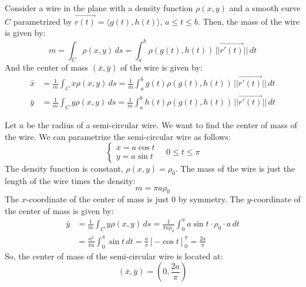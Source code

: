 \documentclass[11pt]{report}
\begin{document}
\begin{definition}
    Consider a wire in the plane with a density function $\rho(x,y)$ and a smooth curve $C$ parametrized by $\vec{r(t)} = \langle g(t), h(t) \rangle$, $a \leq t \leq b$. Then, the mass of the wire is given by:
    \begin{equation}
        m = \int_C \rho(x,y) \, ds = \int_a^b \rho(g(t), h(t)) \, ||\vec{r'(t)}|| \, dt
    \end{equation}
    And the center of mass $(\bar{x}, \bar{y})$ of the wire is given by:
    \begin{align}
        \bar{x} &= \frac{1}{m} \int_C x \rho(x,y) \, ds = \frac{1}{m} \int_a^b g(t) \rho(g(t), h(t)) \, ||\vec{r'(t)}|| \, dt \\
        \bar{y} &= \frac{1}{m} \int_C y \rho(x,y) \, ds = \frac{1}{m} \int_a^b h(t) \rho(g(t), h(t)) \, ||\vec{r'(t)}|| \, dt
    \end{align}
\end{definition}

\begin{example}
    Let $a$ be the radius of a semi-circular wire. We want to find the center of mass of the wire. We can parametrize the semi-circular wire as follows:
    $$
    \begin{cases}
        x = a \cos t \\
        y = a \sin t
    \end{cases} \quad 0 \leq t \leq \pi
    $$
    The density function is constant, $\rho(x,y) = \rho_0$. The mass of the wire is just the length of the wire times the density:
    $$
        m = \pi a \rho_0
    $$
    The $x$-coordinate of the center of mass is just 0 by symmetry. The $y$-coordinate of the center of mass is given by:
    \begin{align*}
        \bar{y} &= \frac{1}{m} \int_C y \rho(x,y) \, ds = \frac{1}{\pi a \rho_0} \int_0^\pi a \sin t \cdot \rho_0 \cdot a \, dt \\
        &= \frac{a^2}{\pi a} \int_0^\pi \sin t \, dt = \frac{a}{\pi} \left[ -\cos t \right]_0^\pi = \frac{2a}{\pi}
    \end{align*}
    So, the center of mass of the semi-circular wire is located at:
    $$
        \left( \bar{x}, \bar{y} \right) = \left( 0, \frac{2a}{\pi} \right)
    $$
\end{example}
\end{document}

